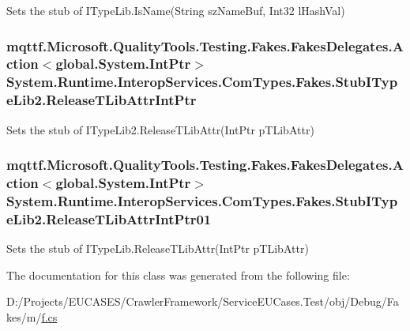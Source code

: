 Sets the stub of I\-Type\-Lib.\-Is\-Name(\-String sz\-Name\-Buf, Int32 l\-Hash\-Val)

\hypertarget{class_system_1_1_runtime_1_1_interop_services_1_1_com_types_1_1_fakes_1_1_stub_i_type_lib2_a60a2f2b95cb8cf899e6c55534ecd9a2b}{
\subsubsection[{Release\-T\-Lib\-Attr\-Int\-Ptr}]{\setlength{\rightskip}{0pt plus 5cm}mqttf.\-Microsoft.\-Quality\-Tools.\-Testing.\-Fakes.\-Fakes\-Delegates.\-Action$<$global.\-System.\-Int\-Ptr$>$ System.\-Runtime.\-Interop\-Services.\-Com\-Types.\-Fakes.\-Stub\-I\-Type\-Lib2.\-Release\-T\-Lib\-Attr\-Int\-Ptr}}\label{class_system_1_1_runtime_1_1_interop_services_1_1_com_types_1_1_fakes_1_1_stub_i_type_lib2_a60a2f2b95cb8cf899e6c55534ecd9a2b}


Sets the stub of I\-Type\-Lib2.\-Release\-T\-Lib\-Attr(\-Int\-Ptr p\-T\-Lib\-Attr)

\hypertarget{class_system_1_1_runtime_1_1_interop_services_1_1_com_types_1_1_fakes_1_1_stub_i_type_lib2_a4eab827ae7e303283dee60417720c7d4}{
\subsubsection[{Release\-T\-Lib\-Attr\-Int\-Ptr01}]{\setlength{\rightskip}{0pt plus 5cm}mqttf.\-Microsoft.\-Quality\-Tools.\-Testing.\-Fakes.\-Fakes\-Delegates.\-Action$<$global.\-System.\-Int\-Ptr$>$ System.\-Runtime.\-Interop\-Services.\-Com\-Types.\-Fakes.\-Stub\-I\-Type\-Lib2.\-Release\-T\-Lib\-Attr\-Int\-Ptr01}}\label{class_system_1_1_runtime_1_1_interop_services_1_1_com_types_1_1_fakes_1_1_stub_i_type_lib2_a4eab827ae7e303283dee60417720c7d4}


Sets the stub of I\-Type\-Lib.\-Release\-T\-Lib\-Attr(\-Int\-Ptr p\-T\-Lib\-Attr)



The documentation for this class was generated from the following file\-:\begin{DoxyCompactItemize}
\item 
D\-:/\-Projects/\-E\-U\-C\-A\-S\-E\-S/\-Crawler\-Framework/\-Service\-E\-U\-Cases.\-Test/obj/\-Debug/\-Fakes/m/\hyperlink{m_2f_8cs}{f.\-cs}\end{DoxyCompactItemize}
